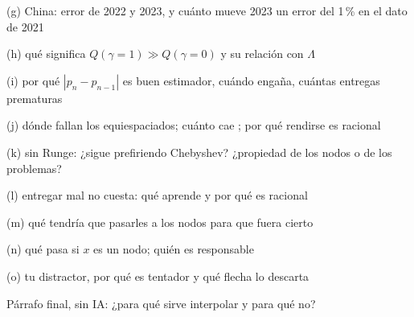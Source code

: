 \clearpage
\begin{respuesta}[2.4cm]{(g) China: error de 2022 y 2023, y cuánto mueve 2023 un error del 1\,\% en el dato de 2021}\end{respuesta}
\begin{respuesta}[2.2cm]{(h) qué significa $Q(\gamma=1)\gg Q(\gamma=0)$ y su relación con $\Lambda$}\end{respuesta}
\begin{respuesta}[2.2cm]{(i) por qué $|p_n-p_{n-1}|$ es buen estimador, cuándo engaña, cuántas entregas prematuras}\end{respuesta}
\begin{respuesta}[2.6cm]{(j) dónde fallan los equiespaciados; cuánto cae ; por qué rendirse es racional}\end{respuesta}
\begin{respuesta}[2.2cm]{(k) sin Runge: ¿sigue prefiriendo Chebyshev? ¿propiedad de los nodos o de los problemas?}\end{respuesta}
\begin{respuesta}[2.4cm]{(l) entregar mal no cuesta: qué aprende y por qué es racional}\end{respuesta}
\begin{respuesta}[2.0cm]{(m) qué tendría que pasarles a los nodos para que  fuera cierto}\end{respuesta}
\begin{respuesta}[2.0cm]{(n) qué pasa si $x$ es un nodo; quién es responsable}\end{respuesta}

\clearpage
\begin{respuesta}[3.4cm]{(o) tu distractor, por qué es tentador y qué flecha lo descarta}\end{respuesta}
\begin{respuesta}[7.5cm]{Párrafo final, sin IA: ¿para qué sirve interpolar y para qué no?}\end{respuesta}

